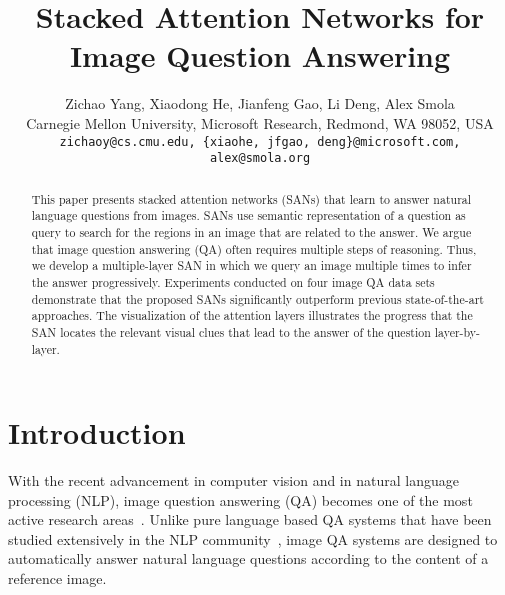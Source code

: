 \documentclass[10pt,twocolumn,letterpaper]{article}
\begin{document}
\title{Stacked Attention Networks for Image Question Answering}

\author{
Zichao Yang,
Xiaodong He,
Jianfeng Gao,
Li Deng,
Alex Smola \\
Carnegie Mellon University,
Microsoft Research, Redmond, WA 98052, USA\\
\texttt{zichaoy@cs.cmu.edu,
\{xiaohe, jfgao, deng\}@microsoft.com,
alex@smola.org}
}

\maketitle

\begin{abstract}
  This paper presents stacked attention networks (SANs) that learn to answer
  natural language questions from images. SANs use semantic representation of a
  question as query to search for the regions in an image that are related to
  the answer. We argue that image question answering (QA) often requires
  multiple steps of reasoning. Thus, we develop a multiple-layer SAN in which
  we query an image multiple times to infer the answer
  progressively. Experiments conducted on four image QA data sets demonstrate
  that the proposed SANs significantly outperform previous state-of-the-art
  approaches. The visualization of the attention layers illustrates the
  progress that the SAN locates the relevant visual clues that lead to the
  answer of the question layer-by-layer.
\end{abstract}

\vspace{-0.3cm}
\section{Introduction}
With the recent advancement in computer vision and in natural language
processing (NLP), image question answering (QA) becomes one of the most active
research areas~\cite{gao2015you, ren2015imageqa, malinowski2014multi,
  antol2015vqa, malinowski2015ask}. Unlike pure language based QA systems that
have been studied extensively in the NLP community~\cite{weston2014memory,
  kumar2015ask, bordes2014question, yih2015semantic, berant2014semantic,
  yih2014semantic}, image QA systems are designed to automatically answer
natural language questions according to the content of a reference image.
\end{document}
